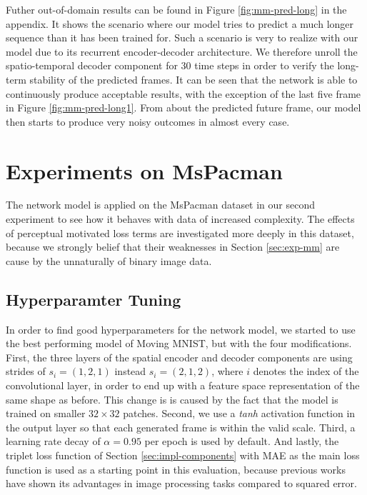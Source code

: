 Futher out-of-domain results can be found in Figure \ref{fig:mm-pred-long} in the appendix. It shows the scenario where our model tries to predict a much longer sequence than it has been trained for. Such a scenario is very to realize with our model due to its recurrent encoder-decoder architecture. We therefore unroll the spatio-temporal decoder component for \num{30} time steps in order to verify the long-term stability of the predicted frames. It can be seen that the network is able to continuously produce acceptable results, with the exception of the last five frame in Figure \ref{fig:mm-pred-long1}. From about the  predicted future frame, our model then starts to produce very noisy outcomes in almost every case.


\section{Experiments on MsPacman} \label{sec:exp-pac}

The network model is applied on the MsPacman dataset in our second experiment to see how it behaves with data of increased complexity. The effects of perceptual motivated loss terms are investigated more deeply in this dataset, because we strongly belief that their weaknesses in Section \ref{sec:exp-mm} are cause by the unnaturally of binary image data.


\subsection{Hyperparamter Tuning}

In order to find good hyperparameters for the network model, we started to use the best performing model of Moving MNIST, but with the four modifications. First, the three layers of the spatial encoder and decoder components are using strides of $s_i=(1, 2, 1)$ instead $s_i=(2, 1, 2)$, where $i$ denotes the index of the convolutional layer, in order to end up with a feature space representation of the same shape as before. This change is is caused by the fact that the model is trained on smaller $32 \times 32$ patches. Second, we use a \textit{tanh} activation function in the output layer so that each generated frame is within the valid scale. Third, a learning rate decay of $\alpha=0.95$ per epoch is used by default. And lastly, the triplet loss function of Section \ref{sec:impl-components} with MAE as the main loss function is used as a starting point in this evaluation, because previous works have shown its advantages in image processing tasks compared to squared error.

